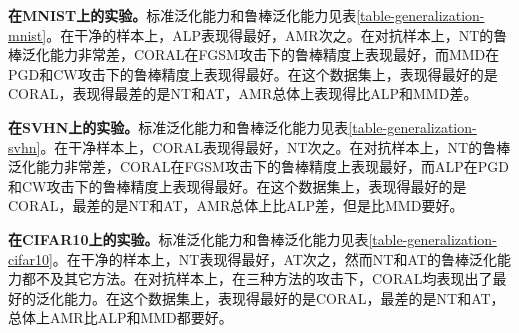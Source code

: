 \begin{table}[h]
\end{table}

\textbf{在MNIST上的实验。}标准泛化能力和鲁棒泛化能力见表\ref{table-generalization-mnist}。在干净的样本上，ALP表现得最好，AMR次之。在对抗样本上，NT的鲁棒泛化能力非常差，CORAL在FGSM攻击下的鲁棒精度上表现最好，而MMD在PGD和CW攻击下的鲁棒精度上表现得最好。在这个数据集上，表现得最好的是CORAL，表现得最差的是NT和AT，AMR总体上表现得比ALP和MMD差。

\textbf{在SVHN上的实验。}标准泛化能力和鲁棒泛化能力见表\ref{table-generalization-svhn}。在干净样本上，CORAL表现得最好，NT次之。在对抗样本上，NT的鲁棒泛化能力非常差，CORAL在FGSM攻击下的鲁棒精度上表现最好，而ALP在PGD和CW攻击下的鲁棒精度上表现得最好。在这个数据集上，表现得最好的是CORAL，最差的是NT和AT，AMR总体上比ALP差，但是比MMD要好。

\textbf{在CIFAR10上的实验。}标准泛化能力和鲁棒泛化能力见表\ref{table-generalization-cifar10}。在干净的样本上，NT表现得最好，AT次之，然而NT和AT的鲁棒泛化能力都不及其它方法。在对抗样本上，在三种方法的攻击下，CORAL均表现出了最好的泛化能力。在这个数据集上，表现得最好的是CORAL，最差的是NT和AT，总体上AMR比ALP和MMD都要好。

